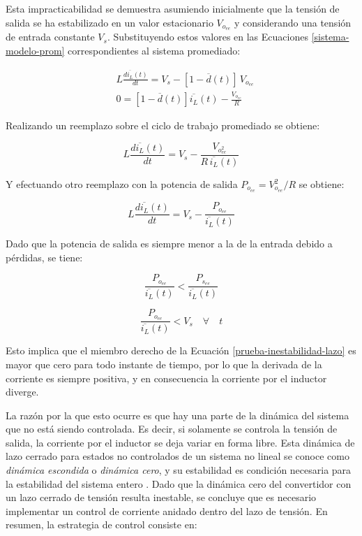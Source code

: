Esta impracticabilidad se demuestra asumiendo inicialmente que la tensión de salida se ha estabilizado en un valor estacionario $V_{o_{ee}}$ y considerando una tensión de entrada constante $V_s$. Substituyendo estos valores en las Ecuaciones \ref{sistema-modelo-prom} correspondientes al sistema promediado:

\begin{equation*}
  \begin{split}
    & L \frac{d \overline{i_L}(t)}{dt} = V_s - \left[1-\overline{d}(t)\right] \, V_{o_{ee}}
    \\
    & 0 = \left[1-\overline{d}(t)\right] \overline{i_L}(t) - \frac{V_{o_{ee}}}{R}
  \end{split}
\end{equation*}

Realizando un reemplazo sobre el ciclo de trabajo promediado se obtiene:

\begin{equation}
  L \frac{d \overline{i_L}(t) }{dt} = V_s - \frac{V_{o_{ee}^2}}{R \, \overline{i_L}(t)}
  \label{prueba-inestabilidad-lazo}
\end{equation}

Y efectuando otro reemplazo con la potencia de salida $P_{o_{ee}} = V_{o_{ee}}^2/R$ se obtiene:

\begin{equation*}
  L \frac{d \overline{i_L}(t)}{dt} = V_s - \frac{P_{o_{ee}}}{ \overline{i_L}(t)}
\end{equation*}

Dado que la potencia de salida es siempre menor a la de la entrada debido a pérdidas, se tiene:

\begin{equation*}
  \frac{P_{o_{ee}}}{\overline{i_L}(t)} < \frac{P_{s_{ee}}}{ \overline{i_L}(t)}
\end{equation*}

\begin{equation*}
  \boxed{\frac{P_{o_{ee}}}{\overline{i_L}(t)} < V_s \quad \forall \quad t}
\end{equation*}

Esto implica que el miembro derecho de la Ecuación \ref{prueba-inestabilidad-lazo} es mayor que cero para todo instante de tiempo, por lo que la derivada de la corriente es siempre positiva, y en consecuencia la corriente por el inductor diverge. 

La razón por la que esto ocurre es que hay una parte de la dinámica del sistema que no está siendo controlada. Es decir, si solamente se controla la tensión de salida, la corriente por el inductor se deja variar en forma libre. Esta dinámica de lazo cerrado para estados no controlados de un sistema no lineal se conoce como \emph{dinámica escondida} o \emph{dinámica cero}, y su estabilidad es condición necesaria para la estabilidad del sistema entero \cite{dynamics}. Dado que la dinámica cero del convertidor con un lazo cerrado de tensión resulta inestable, se concluye que es necesario implementar un control de corriente anidado dentro del lazo de tensión. En resumen, la estrategia de control consiste en:

